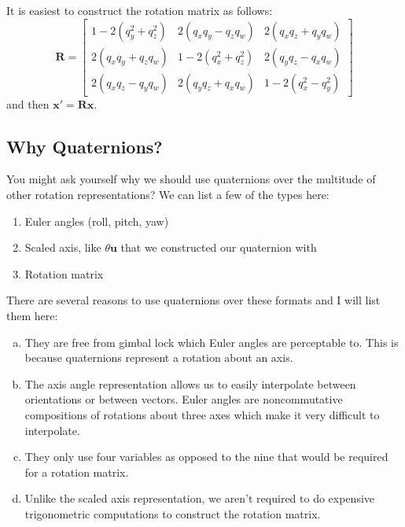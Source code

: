 \documentclass[11pt]{article}
\renewcommand{\vec}[1]{\mathbf{#1}}
\newcommand{\mat}[1]{\mathbf{#1}}
\begin{document}
It is easiest to construct the rotation matrix as follows:
$$\mat{R} = \begin{bmatrix}
1-2(q_y^2+q_z^2) & 2(q_xq_y-q_zq_w) & 2(q_xq_z+q_yq_w)\\
2(q_xq_y+q_zq_w) & 1 - 2(q_x^2+q_z^2) & 2(q_yq_z-q_xq_w)\\
2(q_xq_z-q_yq_w) & 2(q_yq_z +q_xq_w) & 1-2(q_x^2-q_y^2)
\end{bmatrix}$$
and then $\vec{x}' = \mat{R}\vec{x}$.

\subsection{Why Quaternions?}
You might ask yourself why we should use quaternions over the multitude of other rotation representations? We can list a few of the types here:
\begin{enumerate}
\item Euler angles (roll, pitch, yaw)
\item Scaled axis, like $\theta\vec{u}$ that we constructed our quaternion with
\item Rotation matrix
\end{enumerate}

There are several reasons to use quaternions over these formats and I will list them here:
\begin{enumerate}[(a)]
\item They are free from gimbal lock which Euler angles are perceptable to. This is because quaternions represent a rotation about an axis.
\item The axis angle representation allows us to easily interpolate between orientations or between vectors. Euler angles are noncommutative compositions of rotations about three axes which make it very difficult to interpolate.
\item They only use four variables as opposed to the nine that would be required for a rotation matrix.
\item Unlike the scaled axis representation, we aren't required to do expensive trigonometric computations to construct the rotation matrix.
\end{enumerate}
\end{document}
